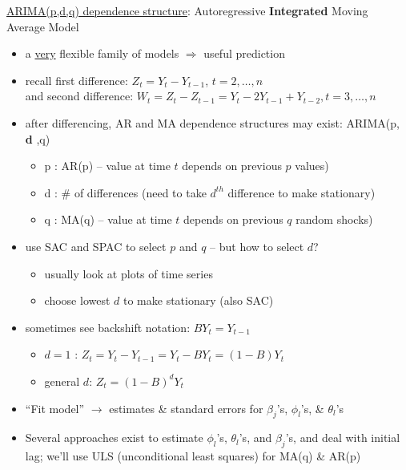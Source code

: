 \documentclass[12pt]{notes}
\begin{document}
\begin{enumerate}[leftmargin=*]
\underline{ARIMA(p,d,q) dependence structure}:  Autoregressive {\bf Integrated}  Moving Average Model
\begin{itemize}
  \item a \underline{very} flexible family of models  $\Rightarrow$ useful prediction
  \item recall first difference: $Z_t = Y_t - Y_{t-1}$, $t=2,\ldots,n$\\
        and second difference: $W_t  = Z_t - Z_{t-1} = Y_t - 2 Y_{t-1} + Y_{t-2}, \mbox{}t=3,\ldots,n$
  \item after differencing, AR and MA dependence structures may exist: ARIMA(p, {\bf d} ,q)
    \begin{itemize}
      \item p : AR(p) -- value at time $t$ depends on previous $p$ values)
      \item d : \# of differences (need to take $d^{th}$ difference to make stationary)
      \item q : MA(q) -- value at time $t$ depends on previous $q$ random shocks)
    \end{itemize}
  \item use SAC and SPAC to select $p$ and $q$ -- but how to select $d$?
    \begin{itemize}
      \item usually look at plots of time series
      \item choose lowest $d$ to make stationary (also SAC)
    \end{itemize}
  \item sometimes see backshift notation:  $B Y_t = Y_{t-1}$
    \begin{itemize}
      \item $d=1$ : $Z_t = Y_t - Y_{t-1} = Y_t - B Y_t = (1-B) Y_t$
      \item general $d$: $Z_t = (1-B)^d Y_t$\\
    \end{itemize}

  \item ``Fit model'' $\rightarrow$ estimates \& standard errors for $\beta_j$'s, $\phi_l$'s, \& $\theta_l$'s\\

  \item Several approaches exist to estimate $\phi_l$'s, $\theta_l$'s, and $\beta_j$'s, and  deal with initial lag; we'll use
ULS (unconditional least squares) for MA(q) \& AR(p)\\




\end{itemize}
\end{enumerate}
\end{document}
